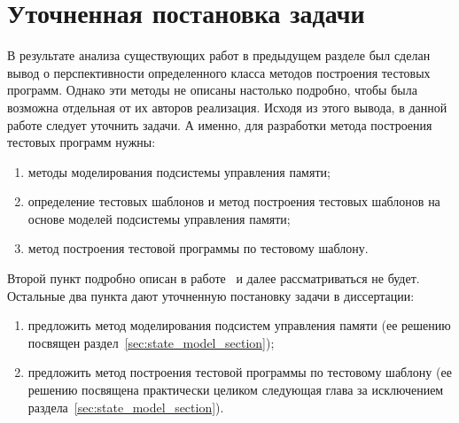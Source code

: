%
%


\section{Уточненная постановка задачи}

В результате анализа существующих работ в предыдущем разделе был сделан вывод о перспективности определенного класса методов построения тестовых программ. Однако эти методы не описаны настолько подробно, чтобы была возможна отдельная от их авторов реализация. Исходя из этого вывода, в данной работе следует уточнить задачи. А именно, для разработки метода построения тестовых программ нужны:
\begin{enumerate}
	\item методы моделирования подсистемы управления памяти;
	\item определение тестовых шаблонов и метод построения тестовых шаблонов на основе моделей подсистемы управления памяти;
	\item метод построения тестовой программы по тестовому шаблону.
\end{enumerate}

Второй пункт подробно описан в работе~\cite{MicroTESK} и далее рассматриваться не будет. Остальные два пункта дают уточненную постановку задачи в диссертации:
\begin{enumerate}
	\item предложить метод моделирования подсистем управления памяти (ее решению посвящен раздел~\ref{sec:state_model_section});
	\item предложить метод построения тестовой программы по тестовому шаблону (ее решению посвящена практически целиком следующая глава за исключением раздела~\ref{sec:state_model_section}).
\end{enumerate}

